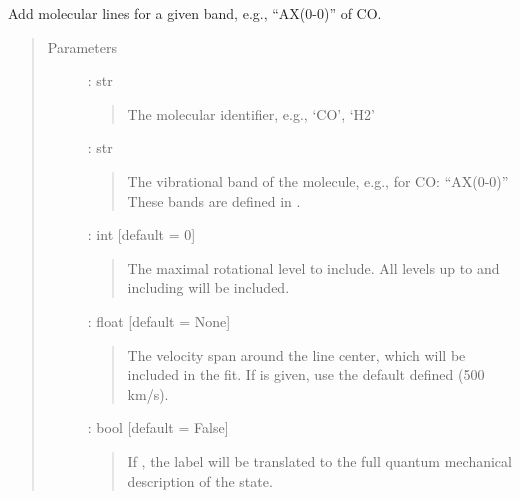 \documentclass[letterpaper,10pt,english]{sphinxmanual}
\begin{document}
\begin{fulllineitems}
\begin{fulllineitems}
\begin{quote}
\begin{description}
\end{description}\end{quote}

\end{fulllineitems}


\begin{fulllineitems}
\label{\detokenize{api:VoigtFit.DataSet.add_molecule}}
Add molecular lines for a given band, e.g., “AX(0-0)” of CO.
\begin{quote}\begin{description}
\item[{Parameters}] \leavevmode
{} : str
\begin{quote}

The molecular identifier, e.g., ‘CO’, ‘H2’
\end{quote}

 : str
\begin{quote}

The vibrational band of the molecule, e.g., for CO: “AX(0-0)”
These bands are defined in .
\end{quote}

 : int   {[}default = 0{]}
\begin{quote}

The maximal rotational level to include. All levels up to and including 
will be included.
\end{quote}

 : float   {[}default = None{]}
\begin{quote}

The velocity span around the line center, which will be included in the fit.
If  is given, use the default 
defined (500 km/s).
\end{quote}

 : bool   {[}default = False{]}
\begin{quote}

If , the label will be translated to the full quantum
mechanical description of the state.
\end{quote}


\end{description}
\end{quote}
\end{fulllineitems}
\end{fulllineitems}
\end{document}
